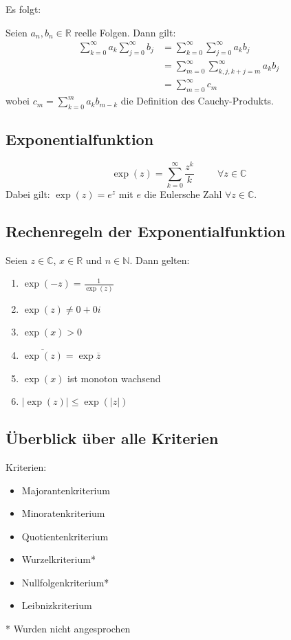 \documentclass[halfparscip]{scrartcl}
\newcounter{subsection2}
\begin{document}
\noindent Es folgt:

Seien $a_n, b_n \in \mathbb{R}$ reelle Folgen. Dann gilt:
\begin{align*}
\sum_{k=0}^{\infty}a_k \sum_{j=0}^{\infty}b_j &= \sum_{k=0}^{\infty}\sum_{j=0}^\infty a_kb_j \\
&= \sum_{m=0}^{\infty}\sum_{k,j,k+j = m}^{\infty} a_kb_j \\
&= \sum_{m=0}^{\infty} c_m
\end{align*}
wobei $c_m = \sum\limits_{k=0}^ma_kb_{m-k}$ die Definition des Cauchy-Produkts.

\subsection{Exponentialfunktion}
\begin{equation*}
	\exp(z) = \sum_{k=0}^\infty\frac{z^k}{k\!} \hspace{1cm}\forall z \in \mathbb{C}
\end{equation*}
Dabei gilt: $\exp(z) = e^z$ mit $e$ die Eulersche Zahl $\forall z \in \mathbb{C}$.

\subsection{Rechenregeln der Exponentialfunktion}
Seien $z \in \mathbb{C}$, $x \in \mathbb{R}$ und $n \in \mathbb{N}$. Dann gelten:
\begin{enumerate}
	\item $\exp(-z) = \frac{1}{\exp(z)}$
	\item $\exp(z) \neq 0+0i$
	\item $\exp(x) > 0$
	\item $\overline{\exp(z)} = \exp \overline{z}$
	\item $\exp(x)$ ist monoton wachsend
	\item $\vert \exp(z)\vert \leq \exp (\vert z\vert)$
\end{enumerate}


\subsection*{Überblick über alle Kriterien}
Kriterien:
\begin{itemize}
	\item Majorantenkriterium
	\item Minoratenkriterium
	\item Quotientenkriterium
	\item Wurzelkriterium*
	\item Nullfolgenkriterium*
	\item Leibnizkriterium
\end{itemize}
* Wurden nicht angesprochen
\end{document}
